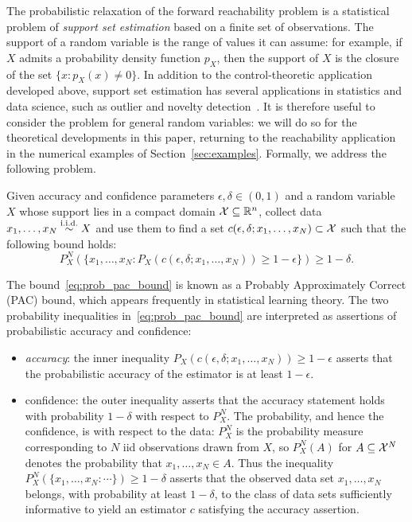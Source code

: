 \documentclass[onefignum,onetabnum]{siamart171218}
\begin{document}
The probabilistic relaxation of the forward reachability problem is a
statistical problem of \emph{support set estimation}
based on a finite set of observations. The support of a random variable is the
range of values it can assume: for example, if $X$ admits a probability density
function $p_X$, then the support of $X$ is the closure of the set
$\{x:p_X(x)\ne0\}$. 
In addition to the control-theoretic application developed above, support set
estimation has several applications in statistics and data science, such as
outlier and novelty detection~\cite{pauwels2021data,pauwels2016sorting,askari2018kernel}. It is therefore useful to consider the problem
for general random variables: we will do so for the theoretical developments in
this paper, returning to the reachability application in the numerical examples
of Section~\ref{sec:examples}. 
Formally, we address the following problem.
\begin{problem}\label{prb:pac_support}
    Given accuracy and confidence parameters $\epsilon,\delta\in(0,1)$
    and
    a random variable $X$ whose support lies in a compact domain $\mathcal{X}\subseteq \mathbb{R}^n$,
    collect data $x_1,\dotsc,x_N\overset{\textrm{i.i.d.}}{\sim} X$
    and use them to find a set $c(\epsilon,\delta;x_1,\dotsc,x_N)\subset\mathcal{X}$ such that 
    the following bound holds:
    \begin{equation}
        \label{eq:prob_pac_bound}
        P_X^N\left(\{x_1,\dotsc,x_N:P_X(c(\epsilon,\delta;x_1,\dotsc,x_N)) \ge 1-\epsilon \}\right) \ge 1-\delta.
    \end{equation}
\end{problem}
The bound~\eqref{eq:prob_pac_bound} is known as a Probably Approximately Correct
(PAC) bound, which appears frequently in statistical learning theory.
The two probability inequalities in~\eqref{eq:prob_pac_bound} are interpreted as
assertions of probabilistic accuracy and confidence:
\begin{itemize}
    \item \emph{accuracy}: the inner inequality 
        $P_X(c(\epsilon,\delta;x_1,\dotsc,x_N)) \ge 1-\epsilon$
        asserts that the probabilistic accuracy of 
        the estimator is at least $1-\epsilon$.
    \item confidence: the outer inequality 
        asserts that the accuracy statement holds with probability $1-\delta$
        with respect to $P_X^N$. The probability, and hence the confidence, 
        is with respect to the data: $P_X^N$ is the probability measure
        corresponding to $N$ iid observations drawn from $X$, so 
        $P_X^N(A)$ for $A\subseteq\mathcal{X}^N$ denotes the probability that 
        $x_1,\dotsc,x_N\in A$. 
        Thus the inequality
        $P_X^N(\{x_1,\dotsc,x_N: \cdots \}) \ge 1-\delta$
        asserts that the observed data set $x_1,\dotsc,x_N$ belongs, with probability
        at least $1-\delta$, to the class of
        data sets sufficiently informative to yield an estimator $c$ satisfying the
        accuracy assertion.
\end{itemize}
\end{document}
